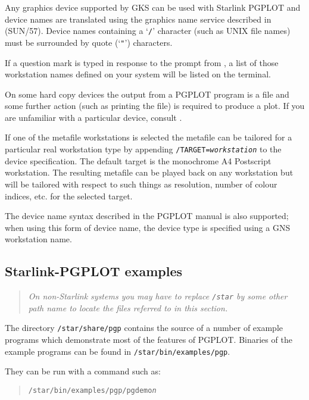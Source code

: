 \documentclass[twoside,11pt,nolof]{starlink}
\begin{document}
Any graphics device supported by GKS can be used with Starlink PGPLOT
and device names are translated using the graphics name service
described in  (SUN/57).  Device names
containing a `\texttt{/}' character (such as UNIX file names) must be
surrounded by quote (`\texttt{"}') characters.

If a question mark is typed in response to the prompt from
, a list of those workstation names
defined on your system will be listed on the terminal.

On some hard copy devices the output from a PGPLOT program is a file
and some further action (such as printing the file) is required to
produce a plot.  If you are unfamiliar with a particular device,
consult .

If one of the metafile workstations is selected the metafile can be
tailored for a particular real workstation type by appending
\texttt{/TARGET=\emph{workstation}} to the device specification.  The
default target is the monochrome A4 Postscript workstation. The
resulting metafile can be played back on any workstation but will be
tailored with respect to such things as resolution, number of colour
indices, etc. for the selected target.

The device name syntax described in the PGPLOT manual is also
supported; when using this form of device name, the device type is
specified using a GNS workstation name.

\subsection{Starlink-PGPLOT examples}
\label{starlink-pgplot_examples}

\begin{quote}
\emph{ On non-Starlink systems you may have to replace \texttt{/star} by
some other path name to locate the files referred to in this section.}
\end{quote}

The directory \texttt{/star/share/pgp} contains the source of a
number of example programs which demonstrate most of the features of
PGPLOT.  Binaries of the example programs can be found in
\texttt{/star/bin/examples/pgp}.

They can be run with a command such as:

\begin{quote}
\texttt{/star/bin/examples/pgp/pgdemo{\emph{n}}}
\end{quote}
\end{document}
